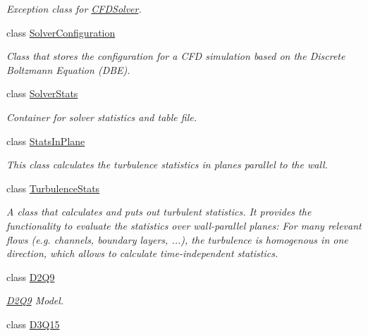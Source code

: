 \begin{DoxyCompactItemize}
\begin{DoxyCompactList}\small\item\em Exception class for \hyperlink{classnatrium_1_1CFDSolver}{CFDSolver}. \item\end{DoxyCompactList}\item 
class \hyperlink{classnatrium_1_1SolverConfiguration}{SolverConfiguration}
\begin{DoxyCompactList}\small\item\em Class that stores the configuration for a CFD simulation based on the Discrete Boltzmann Equation (DBE). \item\end{DoxyCompactList}\item 
class \hyperlink{classnatrium_1_1SolverStats}{SolverStats}
\begin{DoxyCompactList}\small\item\em Container for solver statistics and table file. \item\end{DoxyCompactList}\item 
class \hyperlink{classnatrium_1_1StatsInPlane}{StatsInPlane}
\begin{DoxyCompactList}\small\item\em This class calculates the turbulence statistics in planes parallel to the wall. \item\end{DoxyCompactList}\item 
class \hyperlink{classnatrium_1_1TurbulenceStats}{TurbulenceStats}
\begin{DoxyCompactList}\small\item\em A class that calculates and puts out turbulent statistics. It provides the functionality to evaluate the statistics over wall-\/parallel planes: For many relevant flows (e.g. channels, boundary layers, ...), the turbulence is homogenous in one direction, which allows to calculate time-\/independent statistics. \item\end{DoxyCompactList}\item 
class \hyperlink{classnatrium_1_1D2Q9}{D2Q9}
\begin{DoxyCompactList}\small\item\em \hyperlink{classnatrium_1_1D2Q9}{D2Q9} Model. \item\end{DoxyCompactList}\item 
class \hyperlink{classnatrium_1_1D3Q15}{D3Q15}

\end{DoxyCompactItemize}
